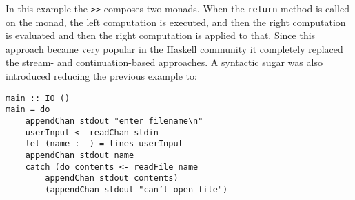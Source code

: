 In this example the \lstinline!>>! composes two monads. When the \lstinline!return! method is called on the monad, the left computation is executed, and then the right computation is evaluated and then the right computation is applied to that. Since this approach became very popular in the Haskell community it completely replaced the stream- and continuation-based approaches. A syntactic sugar was also introduced reducing the previous example to:

\begin{lstlisting}[caption={Example of monadic I/O in Haskell}]
main :: IO ()
main = do
	appendChan stdout "enter filename\n"
	userInput <- readChan stdin
	let (name : _) = lines userInput
	appendChan stdout name
	catch (do contents <- readFile name
		appendChan stdout contents)
		(appendChan stdout "can’t open file")
\end{lstlisting}
